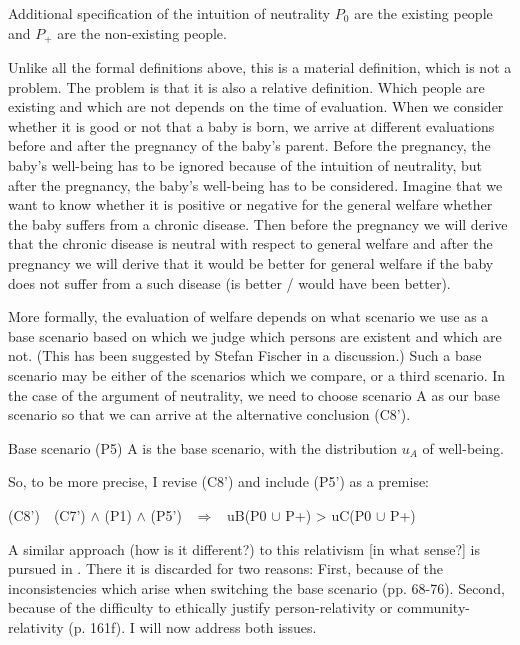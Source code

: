 \begin{Definition}{Additional specification of the intuition of neutrality}{}
$P_0$ are the existing people and $P_+$ are the non-existing people.
\end{Definition}

Unlike all the formal definitions above, this is a material definition, which is not a problem. The problem is that it is also a relative definition. Which people are existing and which are not depends on the time of evaluation. When we consider whether it is good or not that a baby is born, we arrive at different evaluations before and after the pregnancy of the baby’s parent. Before the pregnancy, the baby’s well-being has to be ignored because of the intuition of neutrality, but after the pregnancy, the baby’s well-being has to be considered. Imagine that we want to know whether it is positive or negative for the general welfare whether the baby suffers from a chronic disease. Then before the pregnancy we will derive that the chronic disease is neutral with respect to general welfare and after the pregnancy we will derive that it would be better for general welfare if the baby does not suffer from a such disease (is better / would have been better).  

More formally, the evaluation of welfare depends on what scenario we use as a base scenario based on which we judge which persons are existent and which are not. (This has been suggested by Stefan Fischer in a discussion.) Such a base scenario may be either of the scenarios which we compare, or a third scenario. In the case of the argument of neutrality, we need to choose scenario A as our base scenario so that we can arrive at the alternative conclusion (C8’). 

\begin{Premise}{Base scenario (P5)}{}
A is the base scenario, with the distribution $u_A$ of well-being.
\end{Premise}

So, to be more precise, I revise (C8’) and include (P5’) as a premise:  

(C8’)\ \ (C7’) ${\wedge}$ (P1) ${\wedge}$ (P5’) \ $\Rightarrow $ \ uB(P0 ${\cup}$ P+) {\textgreater} uC(P0 ${\cup}$ P+) 

A similar approach (how is it different?) to this relativism [in what sense?] is pursued in . There it is discarded for two reasons: First, because of the inconsistencies which arise when switching the base scenario (pp. 68-76). Second, because of the difficulty to ethically justify person-relativity or community-relativity (p. 161f). I will now address both issues.  

